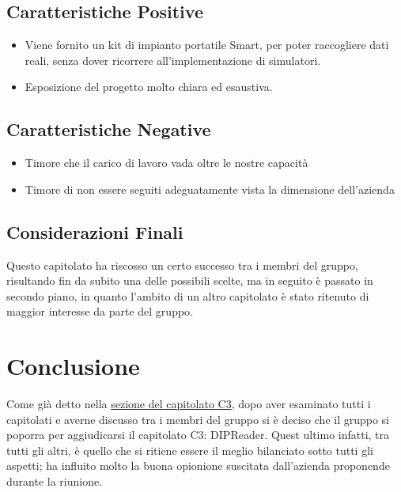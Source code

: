 \documentclass[a4paper,12pt]{article}
\begin{document}
    \subsection{Caratteristiche Positive}
    \begin{itemize}
		\item Viene fornito un kit di impianto portatile Smart, per poter raccogliere dati reali, senza dover ricorrere all’implementazione di simulatori.
		\item Esposizione del progetto molto chiara ed esaustiva.
    \end{itemize}
    \subsection{Caratteristiche Negative}
    \begin{itemize}
        \item Timore che il carico di lavoro vada oltre le nostre capacità   
        \item Timore di non essere seguiti adeguatamente vista la dimensione dell'azienda 
    \end{itemize}
    \subsection{Considerazioni Finali}
    Questo capitolato ha riscosso un certo successo tra i membri del gruppo, risultando fin da subito una delle possibili scelte, ma in seguito è passato in secondo piano, in quanto l’ambito di un altro capitolato è stato ritenuto di maggior interesse da parte del gruppo.


    \section{Conclusione}
    Come già detto nella \hyperref[sec:C3]{sezione del capitolato C3}, dopo aver esaminato tutti i capitolati e averne discusso tra i membri del gruppo si è deciso che il gruppo si poporra per aggiudicarsi il capitolato C3: DIPReader. Quest ultimo infatti, tra tutti gli altri, è quello che si ritiene essere il meglio bilanciato sotto tutti gli aspetti; ha influito molto la buona opionione suscitata dall'azienda proponende durante la riunione.
\end{document}
